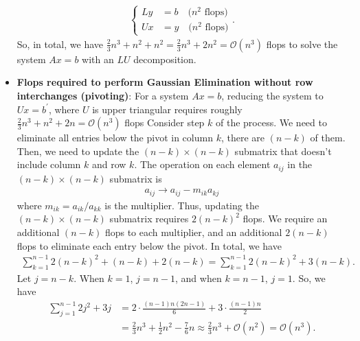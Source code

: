 \documentclass{report}
\begin{document}
\begin{itemize}
            \begin{align*}
                \begin{cases}
                    Ly &= b \quad \text{($n^{2}$ flops)} \\
                    Ux &=y \quad \text{($n^{2}$ flops)}
                \end{cases}
            .\end{align*}
            So, in total, we have $\frac{2}{3}n^{3} + n^{2} + n^{2} = \frac{2}{3}n^{3} + 2n^{2} = \mathcal{O}(n^{3})$ flops to solve the system $Ax = b$ with an $LU$ decomposition.
        \item \textbf{Flops required to perform Gaussian Elimination without row interchanges (pivoting)}: For a system $Ax = b$, reducing the system to $Ux = b^{\prime}$, where $U$ is upper triangular requires roughly $\frac{2}{3}n^{3} + n^{2} + 2n = \mathcal{O}(n^{3})$ flops
            \bigbreak \noindent 
            Consider step $k$ of the process. We need to eliminate all entries below the pivot in column $k$, there are $(n-k)$ of them. Then, we need to update the $(n-k) \times (n-k)$ submatrix that doesn't include column $k$ and row $k$. The operation on each element $a_{ij}$ in the $(n-k) \times (n-k)$ submatrix is
            \begin{align*}
                a_{ij} \to a_{ij} - m_{ik}a_{kj}
            \end{align*}
            where $m_{ik} = a_{ik} / a_{kk}$ is the multiplier. Thus, updating the $(n-k) \times (n-k)$ submatrix requires $2(n-k)^{2}$ flops.
            \bigbreak \noindent 
            We require an additional $(n-k)$ flops to each multiplier, and an additional $2(n-k)$ flops to eliminate each entry below the pivot. 
            \bigbreak \noindent 
            In total, we have
            \begin{align*}
                \sum_{k=1}^{n-1}2(n-k)^{2} + (n-k) + 2(n-k) = \sum_{k=1}^{n-1}2(n-k)^{2} + 3(n-k)
            .\end{align*}
            Let $j = n-k$. When $k=1$, $j=n-1$, and when $k=n-1$, $j = 1$. So, we have
            \begin{align*}
                \sum_{j=1}^{n-1}2j^{2} + 3j &= 2 \cdot \frac{(n-1)n(2n-1)}{6} + 3 \cdot \frac{(n-1)n}{2} \\
                                            &=\frac{2}{3}n^{3} + \frac{1}{2}n^{2} - \frac{7}{6}n \approx \frac{2}{3}n^{3} + \mathcal{O}(n^{2})= \mathcal{O}(n^{3})
            .\end{align*}

\end{itemize}
\end{document}
